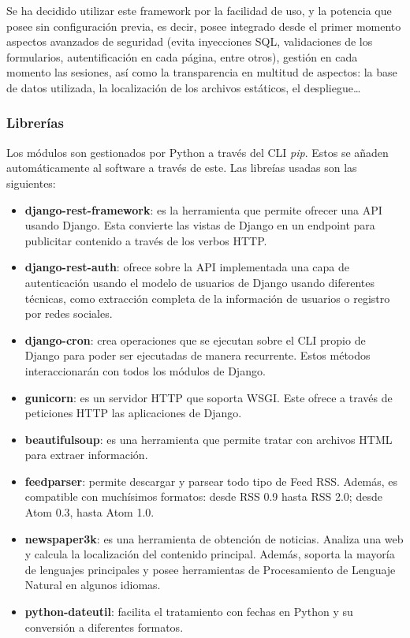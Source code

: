 Se ha decidido utilizar este framework por la facilidad de uso, y la potencia que posee sin configuración previa, es decir, posee integrado desde el primer momento aspectos avanzados de seguridad (evita inyecciones SQL, validaciones de los formularios, autentificación en cada página, entre otros), gestión en cada momento las sesiones, así como la transparencia en multitud de aspectos: la base de datos utilizada, la localización de los archivos estáticos, el despliegue…

\subsubsection{Librerías}
Los módulos son gestionados por Python a través del CLI \textit{pip}. Estos se añaden automáticamente al software a través de este. Las libreías usadas son las siguientes:

\begin{itemize}
    \item \textbf{django-rest-framework}: es la herramienta que permite ofrecer una API usando Django. Esta convierte las vistas de Django en un endpoint para publicitar contenido a través de los verbos HTTP.
    \item \textbf{django-rest-auth}: ofrece sobre la API implementada una capa de autenticación usando el modelo de usuarios de Django usando diferentes técnicas, como extracción completa de la información de usuarios o registro por redes sociales.
    \item \textbf{django-cron}: crea operaciones que se ejecutan sobre el CLI propio de Django para poder ser ejecutadas de manera recurrente. Estos métodos interaccionarán con todos los módulos de Django.
    \item \textbf{gunicorn}: es un servidor HTTP que soporta WSGI. Este ofrece a través de peticiones HTTP las aplicaciones de Django. 
    \item \textbf{beautifulsoup}: es una herramienta que permite tratar con archivos HTML para extraer información.
    \item \textbf{feedparser}: permite descargar y parsear todo tipo de Feed RSS. Además, es compatible con muchísimos formatos: desde RSS 0.9 hasta RSS 2.0; desde Atom 0.3, hasta Atom 1.0.
    \item \textbf{newspaper3k}: es una herramienta de obtención de noticias. Analiza una web y calcula la localización del contenido principal. Además, soporta la mayoría de lenguajes principales y posee herramientas de Procesamiento de Lenguaje Natural en algunos idiomas.
    \item \textbf{python-dateutil}: facilita el tratamiento con fechas en Python y su conversión a diferentes formatos.
\end{itemize}

